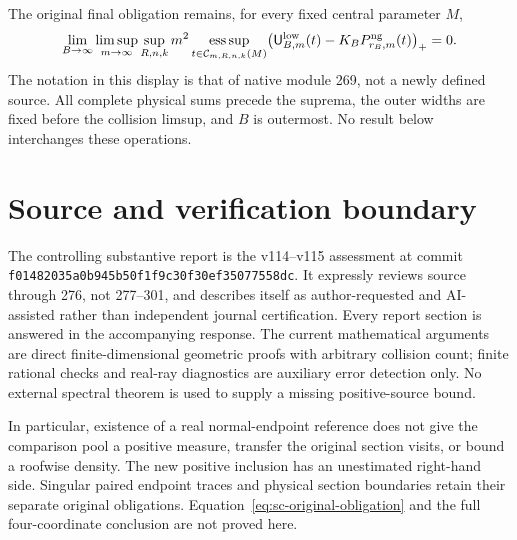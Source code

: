 \documentclass[11pt]{amsart}
\begin{document}
The original final obligation remains, for every fixed central parameter $M$,
\begin{equation}\label{eq:sc-original-obligation}
\lim_{B\to\infty}\limsup_{m\to\infty}\sup_{R,n,k}
 m^2\operatorname*{ess\,sup}_{t\in\mathcal C_{m,R,n,k}(M)}
 \bigl(\mathsf U^{\rm low}_{B,m}(t)-K_BP^{\rm ng}_{r_B,m}(t)\bigr)_+=0.
\end{equation}
The notation in this display is that of native module 269, not a newly defined source. All complete physical sums precede the suprema, the outer widths are fixed before the collision limsup, and $B$ is outermost. No result below interchanges these operations.


\appendix

\section{Source and verification boundary}
The controlling substantive report is the v114--v115 assessment at commit \texttt{f01482035a0b945b50f1f9c30f30ef35077558dc}. It expressly reviews source through 276, not 277--301, and describes itself as author-requested and AI-assisted rather than independent journal certification. Every report section is answered in the accompanying response. The current mathematical arguments are direct finite-dimensional geometric proofs with arbitrary collision count; finite rational checks and real-ray diagnostics are auxiliary error detection only. No external spectral theorem is used to supply a missing positive-source bound.

In particular, existence of a real normal-endpoint reference does not give the comparison pool a positive measure, transfer the original section visits, or bound a roofwise density. The new positive inclusion has an unestimated right-hand side. Singular paired endpoint traces and physical section boundaries retain their separate original obligations. Equation~\eqref{eq:sc-original-obligation} and the full four-coordinate conclusion are not proved here.
\end{document}
